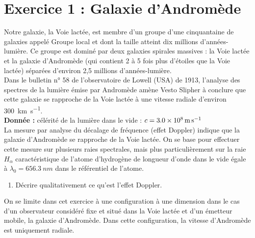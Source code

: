 \documentclass[a4paper,11pt,fleqn]{article}%
\begin{document}
\maketitle

\section*{Exercice 1 : Galaxie d'Andromède}
    Notre galaxie, la Voie lactée, est membre d'un groupe d'une cinquantaine de galaxies appelé Groupe local et dont la taille atteint dix millions d'années-lumière. Ce groupe est dominé par deux galaxies spirales massives : la Voie lactée et la galaxie d'Andromède (qui contient 2 à 5 fois plus d'étoiles que la Voie lactée) séparées d'environ 2,5 millions d'années-lumière.\\
    Dans le bulletin n° 58 de l'observatoire de Lowell (USA) de 1913, l'analyse des spectres de la lumière émise par Andromède amène Vesto Slipher à conclure que cette galaxie se rapproche de la Voie lactée à une vitesse radiale d'environ \SI{300}{\kilo\meter\per\second}.\\
    \textbf{Donnée :} célérité de la lumière dans le vide : $c = \SI{3,0E8}{\meter\per\second}$\\

    La mesure par analyse du décalage de fréquence (effet Doppler) indique que la galaxie d'Andromède se rapproche de la Voie lactée. On se base pour effectuer cette mesure sur plusieurs raies spectrales, mais plus particulièrement sur la raie $H_{\alpha}$ caractéristique de l'atome d'hydrogène de longueur d'onde dans le vide égale à $\lambda_0 = \SI{656,3}{nm}$ dans le référentiel de l'atome.

    \begin{enumerate}
        \item Décrire qualitativement ce qu'est l'effet Doppler.
    \end{enumerate}

    On se limite dans cet exercice à une configuration à une dimension dans le cas d'un observateur considéré fixe et situé dans la Voie lactée et d'un émetteur mobile, la galaxie d'Andromède. Dans cette configuration, la vitesse d'Andromède est uniquement radiale.
\end{document}
